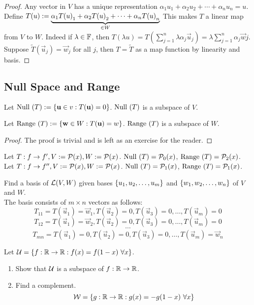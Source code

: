 \begin{proof}
    Any vector in $V$ has a unique representation $\alpha_1 u_1 + \alpha_2u_2 + \cdots + \alpha_n u_n = u$.  \\ Define $T(u):= \underbrace{{\alpha}_1{T(u)}_1 + {\alpha}_2{T(u)}_2 + \cdots + {\alpha}_{n}{T(u)}_{n}}_{\in W}$ This makes $T$ a linear map from $V$ to $W$. Indeed if $\lambda \in \mathbb F$, then $T(\lambda u) = T(\sum_{j = 1}^n \lambda \alpha_j \vec u_j) = \lambda \sum_{j = 1}^n \alpha_j \vec wj$. Suppose $\tilde T(\vec u_j) = \vec w_j$ for all $j$, then $T = \tilde T$ as a map function by linearity and basis.
\end{proof}
\subsection{Null Space and Range}
\begin{theorem}
    Let $\text{Null } (T):= \left\{ \mathbf u \in  v : T(\mathbf u) = 0 \right\}$. $\text{Null } (T)$ is a subspace of $V$.
\end{theorem}
\begin{theorem}
    Let $\text{Range } (T):= \left\{ \mathbf w \in W : T(\mathbf u) = w \right\}$. $\text{Range }(T)$ is a subspace of $W$.
\end{theorem}
\begin{proof}
    The proof is trivial and is left as an exercise for the reader.
\end{proof}
\begin{example}
    Let $T: f \to f', V:= \mathcal P(x), W:= \mathcal P(x)$. $\text{Null }(T) = \mathcal P_0(x)$, $\text{Range }(T) = \mathcal P_2(x)$. \\
    Let $T: f \to f'', V:= \mathcal P(x), W:= \mathcal P(x)$. $\text{Null }(T) = \mathcal P_1(x)$, $\text{Range }(T) = \mathcal P_1(x)$.
\end{example}
\begin{example}
    Find a basis of $\mathcal L (V,W)$ given bases $\left\{ {u}_1,{u}_2, \ldots, {u}_{m} \right\}$ and $\left\{ {w}_1,{w}_2, \ldots, {w}_{n} \right\}$ of $V$ and $W$. \\
    The basis consists of $m \times n$ vectors as follows: 
    \[T_{11} = T(\vec u_1) = \vec w_1, T(\vec u_2) = 0, T(\vec u_3) = 0, \ldots ,T(\vec u_m) = 0\]
    \[T_{12} = T(\vec u_1) = \vec w_2, T(\vec u_2) = 0, T(\vec u_3) = 0, \ldots ,T(\vec u_m) = 0\]
    \[ \cdots \]
    \[T_{mn} = T(\vec u_1) = 0, T(\vec u_2) = 0, T(\vec u_3) = 0, \ldots ,T(\vec u_m) = \vec w_n\]
\end{example}
\begin{example}
    Let $\mathcal U = \left\{ f : \mathbb R \to \mathbb R : f(x) = f(1-x) \ \forall x \right\}$.
    \begin{enumerate}
        \item Show that $\mathcal U$ is a subspace of $f: \mathbb R \to \mathbb R$. 
        
        \item Find a complement.
        \[ \mathcal W  = \left\{ g : \mathbb R \to \mathbb R : g(x) = -g(1 - x) \ \forall x \right\}\]
        
    \end{enumerate}
\end{example}
